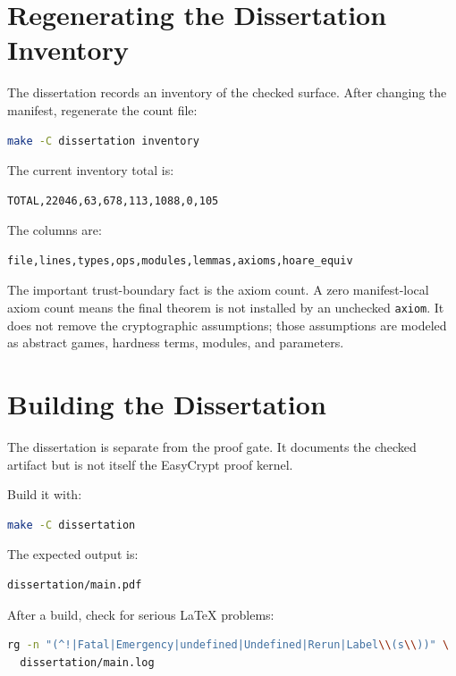 \documentclass[11pt]{article}
\newcommand{\ec}[1]{\nolinkurl{#1}}
\begin{document}
\section{Regenerating the Dissertation Inventory}

The dissertation records an inventory of the checked surface.  After changing
the manifest, regenerate the count file:

\begin{lstlisting}[language=bash]
make -C dissertation inventory
\end{lstlisting}

The current inventory total is:

\begin{lstlisting}
TOTAL,22046,63,678,113,1088,0,105
\end{lstlisting}

The columns are:

\begin{lstlisting}
file,lines,types,ops,modules,lemmas,axioms,hoare_equiv
\end{lstlisting}

The important trust-boundary fact is the axiom count.  A zero manifest-local
axiom count means the final theorem is not installed by an unchecked
\ec{axiom}.  It does not remove the cryptographic assumptions; those assumptions
are modeled as abstract games, hardness terms, modules, and parameters.

\section{Building the Dissertation}

The dissertation is separate from the proof gate.  It documents the checked
artifact but is not itself the EasyCrypt proof kernel.

Build it with:

\begin{lstlisting}[language=bash]
make -C dissertation
\end{lstlisting}

The expected output is:

\begin{lstlisting}[language=bash]
dissertation/main.pdf
\end{lstlisting}

After a build, check for serious LaTeX problems:

\begin{lstlisting}[language=bash]
rg -n "(^!|Fatal|Emergency|undefined|Undefined|Rerun|Label\\(s\\))" \
  dissertation/main.log
\end{lstlisting}
\end{document}
